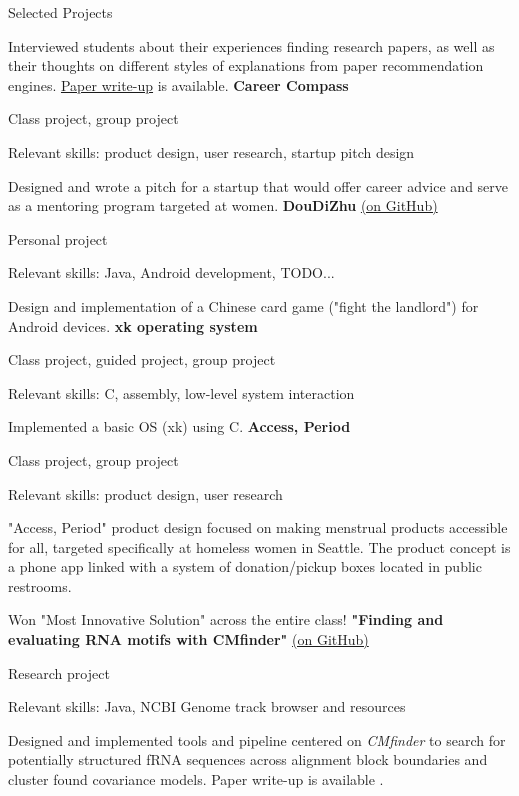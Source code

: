\begin{rubric}{Selected Projects}
	\par Interviewed students about their experiences finding research papers, as well as their thoughts on different styles of explanations from paper recommendation engines. \href{https://github.com/cephcyn/cephcyn.github.io/raw/master/documents/u_cse510/final_ContextExpl.pdf}{Paper write-up} is available.
\entry*[2020] %
	\textbf{Career Compass} %
	\par Class project, group project
	\par Relevant skills: product design, user research, startup pitch design
	\par Designed and wrote a pitch for a startup that would offer career advice and serve as a mentoring program targeted at women.
\entry*[2019] %
	\textbf{DouDiZhu} \href{https://github.com/cephcyn/DouDiZhu}{(on GitHub)}
	\par Personal project
	\par Relevant skills: Java, Android development, TODO...
	\par Design and implementation of a Chinese card game ("fight the landlord") for Android devices. %
\entry*[2019] %
	\textbf{xk operating system} %
	\par Class project, guided project, group project
	\par Relevant skills: C, assembly, low-level system interaction
	\par Implemented a basic OS (xk) using C. %
\entry*[2019] %
	\textbf{Access, Period} %
	\par Class project, group project
	\par Relevant skills: product design, user research
	\par "Access, Period" product design focused on making menstrual products accessible for all, targeted specifically at homeless women in Seattle. The product concept is a phone app linked with a system of donation/pickup boxes located in public restrooms.
	\par Won "Most Innovative Solution" across the entire class!
\entry*[2019] %
	\textbf{"Finding and evaluating RNA motifs with CMfinder"} \href{https://github.com/cephcyn/jcmf}{(on GitHub)}
	\par Research project
	\par Relevant skills: Java, NCBI Genome track browser and resources
	\par Designed and implemented tools and pipeline centered on \textit{CMfinder} to search for potentially structured fRNA sequences across alignment block boundaries and cluster found covariance models. Paper write-up is available \cite{zhou2019thesis}.

\end{rubric}
